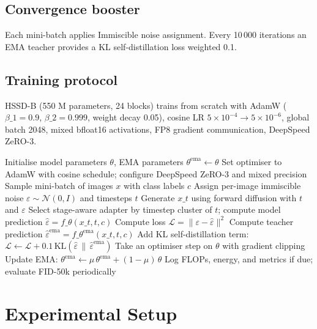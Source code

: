 \documentclass{article}
\begin{document}
\subsection{Convergence booster}
Each mini-batch applies Immiscible noise assignment. Every 10\,000 iterations an EMA teacher provides a KL self-distillation loss weighted 0.1.

\subsection{Training protocol}
HSSD-B (550 M parameters, 24 blocks) trains from scratch with AdamW ($\beta\_1 = 0.9$, $\beta\_2 = 0.999$, weight decay 0.05), cosine LR $5 \times 10^{-4} \rightarrow 5 \times 10^{-6}$, global batch 2048, mixed bfloat16 activations, FP8 gradient communication, DeepSpeed ZeRO-3.

\begin{algorithm}[H]
\caption{HSSD training loop with immiscible noise and EMA self-distillation}
\begin{algorithmic}[1]
\State Initialise model parameters $\theta$, EMA parameters $\theta^{\text{ema}} \leftarrow \theta$
\State Set optimiser to AdamW with cosine schedule; configure DeepSpeed ZeRO-3 and mixed precision
  \State Sample mini-batch of images $x$ with class labels $c$
  \State Assign per-image immiscible noise $\varepsilon \sim \mathcal{N}(0, I)$ and timesteps $t$
  \State Generate $x\_t$ using forward diffusion with $t$ and $\varepsilon$
  \State Select stage-aware adapter by timestep cluster of $t$; compute model prediction $\hat{\varepsilon} = f\_{\theta}(x\_t, t, c)$
  \State Compute loss $\mathcal{L} = \|\varepsilon - \hat{\varepsilon}\|^2$
    \State Compute teacher prediction $\hat{\varepsilon}^{\text{ema}} = f\_{\theta^{\text{ema}}}(x\_t, t, c)$
    \State Add KL self-distillation term: $\mathcal{L} \leftarrow \mathcal{L} + 0.1\,\mathrm{KL}(\hat{\varepsilon}\,\|\,\hat{\varepsilon}^{\text{ema}})$
  \EndIf
  \State Take an optimiser step on $\theta$ with gradient clipping
  \State Update EMA: $\theta^{\text{ema}} \leftarrow \mu\,\theta^{\text{ema}} + (1-\mu)\,\theta$
  \State Log FLOPs, energy, and metrics if due; evaluate FID-50k periodically
\EndWhile
\end{algorithmic}
\end{algorithm}

\section{Experimental Setup}
\end{document}
